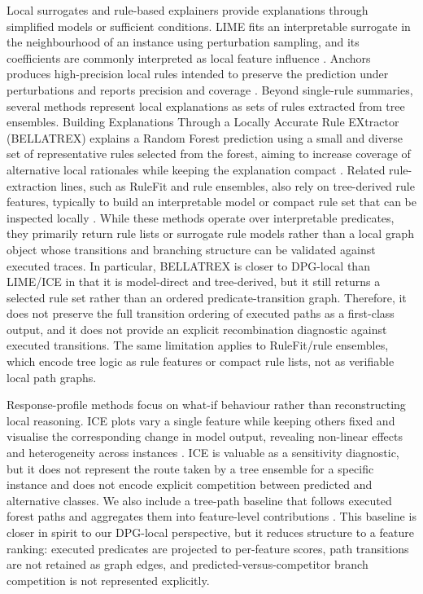\documentclass[runningheads]{llncs}
\begin{document}
Local surrogates and rule-based explainers provide explanations through simplified models or sufficient conditions. LIME fits an interpretable surrogate in the neighbourhood of an instance using perturbation sampling, and its coefficients are commonly interpreted as local feature influence \cite{ribeiro2016why}. Anchors produces high-precision local rules intended to preserve the prediction under perturbations and reports precision and coverage \cite{ribeiro2018anchors}. 
Beyond single-rule summaries, several methods represent local explanations as sets of rules extracted from tree ensembles. Building Explanations Through a Locally Accurate Rule EXtractor (BELLATREX) explains a Random Forest prediction using a small and diverse set of representative rules selected from the forest, aiming to increase coverage of alternative local rationales while keeping the explanation compact \cite{dedja2023bellatrex}. 
Related rule-extraction lines, such as RuleFit and rule ensembles, also rely on tree-derived rule features, typically to build an interpretable model or compact rule set that can be inspected locally \cite{friedman2008predictive}.
While these methods operate over interpretable predicates, they primarily return rule lists or surrogate rule models rather than a local graph object whose transitions and branching structure can be validated against executed traces.
In particular, BELLATREX is closer to DPG-local than LIME/ICE in that it is model-direct and tree-derived, but it still returns a selected rule set rather than an ordered predicate-transition graph. Therefore, it does not preserve the full transition ordering of executed paths as a first-class output, and it does not provide an explicit recombination diagnostic against executed transitions.
The same limitation applies to RuleFit/rule ensembles, which encode tree logic as rule features or compact rule lists, not as verifiable local path graphs.

Response-profile methods focus on what-if behaviour rather than reconstructing local reasoning. ICE plots vary a single feature while keeping others fixed and visualise the corresponding change in model output, revealing non-linear effects and heterogeneity across instances \cite{goldstein2015ice}. ICE is valuable as a sensitivity diagnostic, but it does not represent the route taken by a tree ensemble for a specific instance and does not encode explicit competition between predicted and alternative classes. We also include a tree-path baseline that follows executed forest paths and aggregates them into feature-level contributions \cite{palczewska2014interpreting}. This baseline is closer in spirit to our DPG-local perspective, but it reduces structure to a feature ranking: executed predicates are projected to per-feature scores, path transitions are not retained as graph edges, and predicted-versus-competitor branch competition is not represented explicitly.
\end{document}
